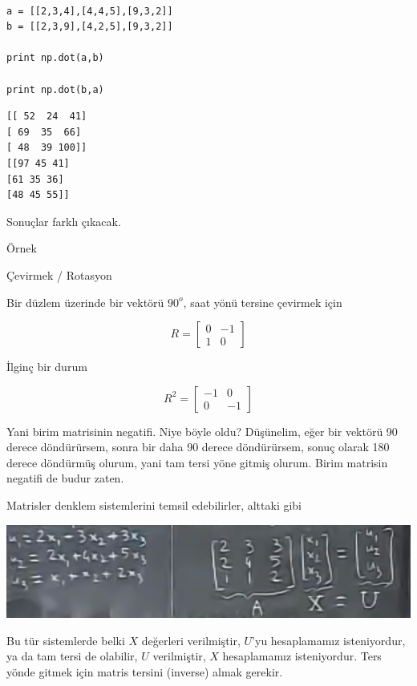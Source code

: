 \documentclass[12pt,fleqn]{article}\usepackage{../../common}
\begin{document}
\begin{verbatim}

a = [[2,3,4],[4,4,5],[9,3,2]]
b = [[2,3,9],[4,2,5],[9,3,2]]

print np.dot(a,b)

print np.dot(b,a)
\end{verbatim}

\begin{verbatim}
[[ 52  24  41]
[ 69  35  66]
[ 48  39 100]]
[[97 45 41]
[61 35 36]
[48 45 55]]
\end{verbatim}

Sonuçlar farklı çıkacak.

Örnek

Çevirmek / Rotasyon

Bir düzlem üzerinde bir vektörü $90^o$, saat yönü tersine
çevirmek için

$$ R =
\left[\begin{array}{rr}
0 & -1 \\
1 & 0
\end{array}\right]
$$

İlginç bir durum

$$ R^2 =
\left[\begin{array}{rr}
-1 & 0 \\
0 & -1
\end{array}\right]
$$

Yani birim matrisinin negatifi. Niye böyle oldu? Düşünelim, eğer bir vektörü 90
derece döndürürsem, sonra bir daha 90 derece döndürürsem, sonuç olarak 180
derece döndürmüş olurum, yani tam tersi yöne gitmiş olurum. Birim matrisin
negatifi de budur zaten.

Matrisler denklem sistemlerini temsil edebilirler, alttaki gibi

\begin{center}
\includegraphics[width=14.9cm]{3_5.png}
\end{center}

Bu tür sistemlerde belki $X$ değerleri verilmiştir, $U$'yu hesaplamamız
isteniyordur, ya da tam tersi de olabilir, $U$ verilmiştir, $X$ hesaplamamız
isteniyordur. Ters yönde gitmek için matris tersini (inverse) almak gerekir.
\end{document}
